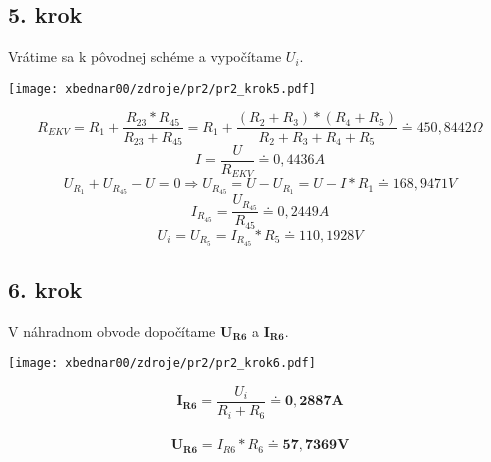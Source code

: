 \subsection*{5. krok}
Vrátime sa k pôvodnej schéme a vypočítame $U_i$.
\begin{center}
\texttt{[image: xbednar00/zdroje/pr2/pr2\_krok5.pdf]}
\end{center}
$$R_{EKV}= R_1+\frac{R_{23}*R_{45}}{R_{23}+R_{45}} = R_1+\frac{(R_2+R_3)*(R_4+R_5)}{R_2+R_3+R_4+R_5} \doteq 450,8442\Omega$$
$$I = \frac{U}{R_{EKV}} \doteq 0,4436A$$
$$U_{R_1}+U_{R_{45}}-U = 0 \Longrightarrow U_{R_{45}} = U-U_{R_1} = U-I*R_1 \doteq 168,9471V$$
$$I_{R_{45}} = \frac{U_{R_{45}}}{R_{45}} \doteq 0,2449A$$
$$U_i = U_{R_5} = I_{R_{45}}*R_5 \doteq 110,1928V$$

\newpage
\subsection*{6. krok}
V náhradnom obvode dopočítame $\pmb{U_{R6}}$ a $\pmb{I_{R6}}$.
\begin{center}
\texttt{[image: xbednar00/zdroje/pr2/pr2\_krok6.pdf]}
\end{center}
$$\pmb{I_{R6}}= \frac{U_i}{R_i+R_6} \doteq \pmb{0,2887A}$$\\
$$\pmb{U_{R6}} = I_{R6}*R_6 \doteq \pmb{57,7369V}$$